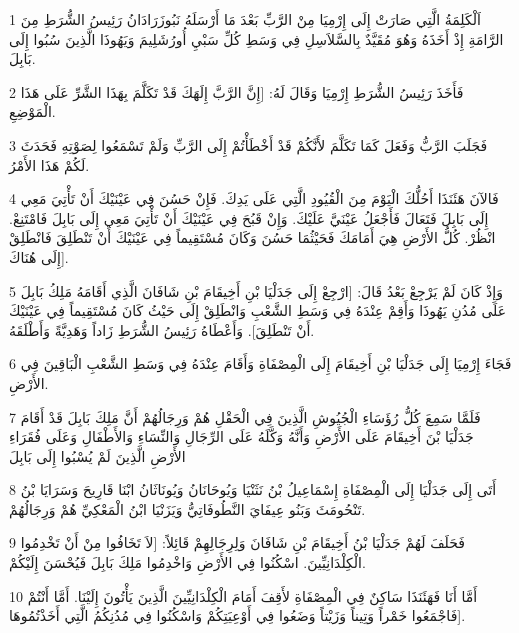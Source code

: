 \par 1 اَلْكَلِمَةُ الَّتِي صَارَتْ إِلَى إِرْمِيَا مِنْ الرَّبِّ بَعْدَ مَا أَرْسَلَهُ نَبُوزَرَادَانُ رَئِيسُ الشُّرَطِ مِنَ الرَّامَةِ إِذْ أَخَذَهُ وَهُوَ مُقَيَّدٌ بِالسَّلاَسِلِ فِي وَسَطِ كُلِّ سَبْيِ أُورُشَلِيمَ وَيَهُوذَا الَّذِينَ سُبُوا إِلَى بَابِلَ.
\par 2 فَأَخَذَ رَئِيسُ الشُّرَطِ إِرْمِيَا وَقَالَ لَهُ: [إِنَّ الرَّبَّ إِلَهَكَ قَدْ تَكَلَّمَ بِهَذَا الشَّرِّ عَلَى هَذَا الْمَوْضِعِ.
\par 3 فَجَلَبَ الرَّبُّ وَفَعَلَ كَمَا تَكَلَّمَ لأَنَّكُمْ قَدْ أَخْطَأْتُمْ إِلَى الرَّبِّ وَلَمْ تَسْمَعُوا لِصَوْتِهِ فَحَدَثَ لَكُمْ هَذَا الأَمْرُ.
\par 4 فَالآنَ هَئَنَذَا أَحُلُّكَ الْيَوْمَ مِنَ الْقُيُودِ الَّتِي عَلَى يَدِكَ. فَإِنْ حَسُنَ فِي عَيْنَيْكَ أَنْ تَأْتِيَ مَعِي إِلَى بَابِلَ فَتَعَالَ فَأَجْعَلُ عَيْنَيَّ عَلَيْكَ. وَإِنْ قَبُحَ فِي عَيْنَيْكَ أَنْ تَأْتِيَ مَعِي إِلَى بَابِلَ فَامْتَنِعْ. انْظُرْ. كُلُّ الأَرْضِ هِيَ أَمَامَكَ فَحَيْثُمَا حَسُنَ وَكَانَ مُسْتَقِيماً فِي عَيْنَيْكَ أَنْ تَنْطَلِقَ فَانْطَلِقْ إِلَى هُنَاكَ].
\par 5 وَإِذْ كَانَ لَمْ يَرْجِعْ بَعْدُ قَالَ: [ارْجِعْ إِلَى جَدَلْيَا بْنِ أَخِيقَامَ بْنِ شَافَانَ الَّذِي أَقَامَهُ مَلِكُ بَابِلَ عَلَى مُدُنِ يَهُوذَا وَأَقِمْ عِنْدَهُ فِي وَسَطِ الشَّعْبِ وَانْطَلِقْ إِلَى حَيْثُ كَانَ مُسْتَقِيماً فِي عَيْنَيْكَ أَنْ تَنْطَلِقَ]. وَأَعْطَاهُ رَئِيسُ الشُّرَطِ زَاداً وَهَدِيَّةً وَأَطْلَقَهُ.
\par 6 فَجَاءَ إِرْمِيَا إِلَى جَدَلْيَا بْنِ أَخِيقَامَ إِلَى الْمِصْفَاةِ وَأَقَامَ عِنْدَهُ فِي وَسَطِ الشَّعْبِ الْبَاقِينَ فِي الأَرْضِ.
\par 7 فَلَمَّا سَمِعَ كُلُّ رُؤَسَاءِ الْجُيُوشِ الَّذِينَ فِي الْحَقْلِ هُمْ وَرِجَالُهُمْ أَنَّ مَلِكَ بَابِلَ قَدْ أَقَامَ جَدَلْيَا بْنَ أَخِيقَامَ عَلَى الأَرْضِ وَأَنَّهُ وَكَّلَهُ عَلَى الرِّجَالِ وَالنِّسَاءِ وَالأَطْفَالِ وَعَلَى فُقَرَاءِ الأَرْضِ الَّذِينَ لَمْ يُسْبُوا إِلَى بَابِلَ
\par 8 أَتَى إِلَى جَدَلْيَا إِلَى الْمِصْفَاةِ إِسْمَاعِيلُ بْنُ نَثَنْيَا وَيُوحَانَانُ وَيُونَاثَانُ ابْنَا قَارِيحَ وَسَرَايَا بْنُ تَنْحُومَثَ وَبَنُو عِيفَايَ النَّطُوفَاتِيُّ وَيَزَنْيَا ابْنُ الْمَعْكِيِّ هُمْ وَرِجَالُهُمْ.
\par 9 فَحَلَفَ لَهُمْ جَدَلْيَا بْنُ أَخِيقَامَ بْنِ شَافَانَ وَلِرِجَالِهِمْ قَائِلاً: [لاَ تَخَافُوا مِنْ أَنْ تَخْدِمُوا الْكِلْدَانِيِّينَ. اسْكُنُوا فِي الأَرْضِ وَاخْدِمُوا مَلِكَ بَابِلَ فَيُحْسَنَ إِلَيْكُمْ.
\par 10 أَمَّا أَنَا فَهَئَنَذَا سَاكِنٌ فِي الْمِصْفَاةِ لأَقِفَ أَمَامَ الْكِلْدَانِيِّينَ الَّذِينَ يَأْتُونَ إِلَيْنَا. أَمَّا أَنْتُمْ فَاجْمَعُوا خَمْراً وَتِيناً وَزَيْتاً وَضَعُوا فِي أَوْعِيَتِكُمْ وَاسْكُنُوا فِي مُدُنِكُمُ الَّتِي أَخَذْتُمُوهَا].

